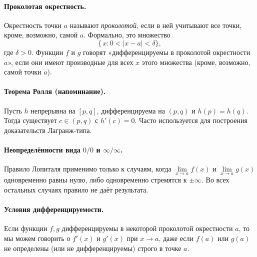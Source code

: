 
\paragraph{Проколотая окрестность.}
Окрестность точки $a$ называют \emph{проколотой}, если в ней
учитывают все точки, кроме, возможно, самой $a$. Формально,
это множество
\[
	\{\,x : 0<|x-a|<\delta\},
\]
где $\delta>0$. Функции $f$ и $g$ говорят «дифференцируемы в проколотой окрестности $a$», если они имеют производные для всех $x$ этого множества (кроме, возможно, самой точки $a$).

\bigskip

\paragraph{Теорема Ролля (напоминание).}
Пусть $h$ непрерывна на $[p,q]$, дифференцируема на $(p,q)$
и $h(p)=h(q)$. Тогда существует $c\in(p,q)$ с $h'(c)=0$.
Часто используется для построения доказательств Лагранж‐типа.

\bigskip

\paragraph{Неопределённости вида $0/0$ и $\infty/\infty$.}
Правило Лопиталя применимо только к случаям, когда
\(\lim\limits_{x\to a} f(x)\) и \(\lim\limits_{x\to a} g(x)\)
одновременно равны нулю, либо одновременно стремятся к $\pm\infty$.
Во всех остальных случаях правило не даёт результата.

\bigskip

\paragraph{Условия дифференцируемости.}
Если функции $f,g$ дифференцируемы в некоторой проколотой окрестности $a$,
то мы можем говорить о $f'(x)$ и $g'(x)$ при $x\to a$,
даже если $f(a)$ или $g(a)$ не определены (или не дифференцируемы) строго в точке $a$.
